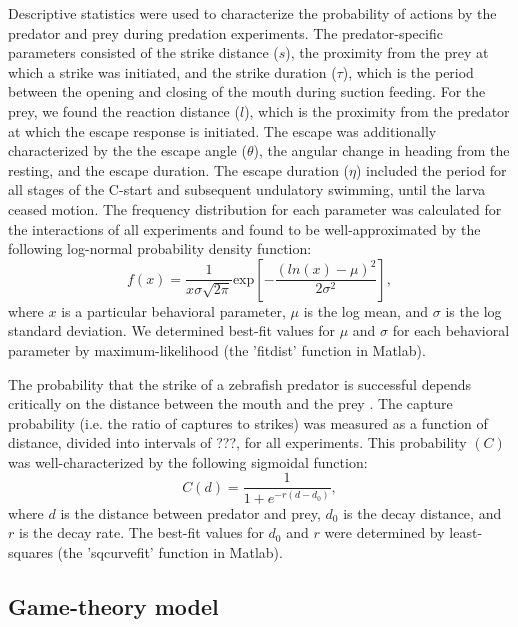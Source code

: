 \documentclass[]{rsos}%
\begin{document}
Descriptive statistics were used to characterize the probability of actions by the predator and prey during predation experiments.
The predator-specific parameters consisted of the strike distance ($s$), the proximity from the prey at which a strike was initiated, and the strike duration ($\tau$), which is the period between the opening and closing of the mouth during suction feeding. 
For the prey, we found the reaction distance ($l$), which is the proximity from the predator at which the escape response is initiated.
The escape was additionally characterized by the the escape angle ($\theta$), the angular change in heading from the resting, and the escape duration.
The escape duration ($\eta$) included the period for all stages of the C-start and subsequent undulatory swimming, until the larva ceased motion.
The frequency distribution for each parameter was calculated for the interactions of all experiments and found to be well-approximated by the following log-normal probability density function:
%
\begin{equation}%
f(x) = \frac{1}{x\sigma \sqrt{2 \pi}} \text{exp} \left[ -{\frac{(ln(x)-\mu)^2}{2\sigma ^2}} \right],
\label{eqn_lognorm}
\end{equation}
%
where $x$ is a particular behavioral parameter, $\mu$ is the log mean, and $\sigma$ is the log standard deviation. 
We determined best-fit values for $\mu$ and $\sigma$ for each behavioral parameter by maximum-likelihood (the 'fitdist' function in Matlab).

The probability that the strike of a zebrafish predator is successful depends critically on the distance between the mouth and the prey \cite{Stewart:2013bha}.
The capture probability (i.e. the ratio of captures to strikes) was measured as a function of distance, divided into intervals of ???, for all experiments.
This probability $(C)$ was well-characterized by the following sigmoidal function:
%
\begin{equation}%
C(d) = \frac{1}{1+e^{-r(d-d_0)}},
\label{eqn_sig} 
\end{equation}
%
where $d$ is the distance between predator and prey, $d_0$ is the decay distance, and $r$ is the decay rate. 
The best-fit values for $d_0$ and $r$ were determined by least-squares (the 'sqcurvefit' function in Matlab).

\subsection{Game-theory model}
\end{document}
